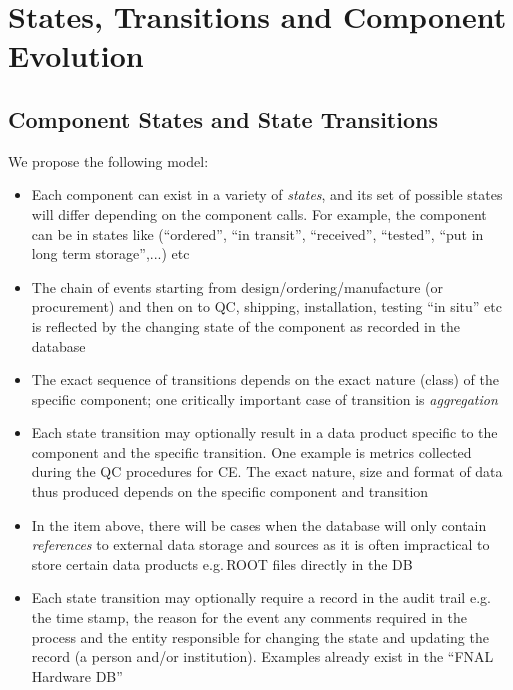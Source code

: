\documentclass[pdftex,12pt,letter]{article}
\begin{document}
\section{States, Transitions and Component Evolution}

\subsection{Component States and State Transitions}
\label{states}
We propose the following model:

\begin{itemize}

\item Each component can exist in a variety of \textit{states}, and its set of possible states will differ depending on
the component calls. For example, the component can be in states like (``ordered'', ``in transit'', ``received'', ``tested'', ``put in long term storage'',...) etc

\item The chain of events starting from design/ordering/manufacture (or procurement) and then on to QC,
shipping, installation, testing ``in situ'' etc is reflected by the changing state of the component as recorded
in the database

\item The exact sequence of transitions depends on the exact nature (class) of the specific  component; one
critically important case of transition is \textit{aggregation}

\item Each state transition may optionally result in a data product specific to the component and the specific transition.
One example is metrics collected during the QC procedures for CE. The exact nature, size and format of data thus produced
depends on the specific component and transition

\item In the item above, there will be cases when the database will only contain \textit{references} to external data storage
and sources as it is often impractical to store certain data products e.g.\,ROOT files directly in the DB

\item Each state transition may optionally require a record in the audit trail e.g.\,the time stamp, the reason for the event
any comments required in the process and the entity responsible for changing the state and updating the record
(a person and/or institution). Examples already exist in the ``FNAL Hardware DB''

\end{itemize}
\end{document}
